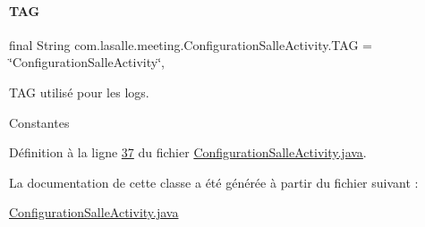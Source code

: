 \paragraph{\texorpdfstring{T\+AG}{TAG}}
{\footnotesize\ttfamily final String com.\+lasalle.\+meeting.\+Configuration\+Salle\+Activity.\+T\+AG = \char`\"{}Configuration\+Salle\+Activity\char`\"{}\hspace{0.3cm}{\ttfamily [static]}, {\ttfamily [private]}}



T\+AG utilisé pour les logs. 

Constantes 

Définition à la ligne \hyperlink{_configuration_salle_activity_8java_source_l00037}{37} du fichier \hyperlink{_configuration_salle_activity_8java_source}{Configuration\+Salle\+Activity.\+java}.



La documentation de cette classe a été générée à partir du fichier suivant \+:\begin{DoxyCompactItemize}
\item 
\hyperlink{_configuration_salle_activity_8java}{Configuration\+Salle\+Activity.\+java}\end{DoxyCompactItemize}
